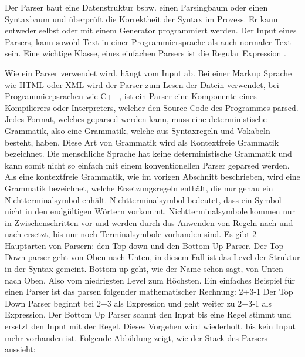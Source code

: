 Der Parser baut eine Datenstruktur bsbw. einen Parsingbaum oder einen Syntaxbaum und überprüft die Korrektheit der Syntax im Prozess. Er kann entweder selbst oder mit einem Generator programmiert werden. Der Input eines Parsers, kann sowohl Text in einer Programmiersprache als auch normaler Text sein. Eine wichtige Klasse, eines einfachen Parsers ist die \glqq{} Regular Expression \grqq{}.

Wie ein Parser verwendet wird, hängt vom Input ab. Bei einer Markup Sprache wie HTML oder XML wird der Parser zum Lesen der Datein verwendet, bei Programmierpsrachen wie C++, ist ein Parser eine Komponente eines Kompilierers oder Interpreters, welcher den Source Code des Programmes parsed.\newline\newline
Jedes Format, welches geparsed werden kann, muss eine deterministische Grammatik, also eine Grammatik, welche aus Syntaxregeln und Vokabeln besteht, haben. Diese Art von Grammatik wird als \glqq{} Kontextfreie Grammatik \grqq{} bezeichnet. Die menschliche Sprache hat keine deterministische Grammatik und kann somit nicht so einfach mit einem konventionellen Parser geparsed werden. \autocite[]{Garsiel.}\newline\newline
Als eine kontextfreie Grammatik, wie im vorigen Abschnitt beschrieben, wird eine Grammatik bezeichnet, welche Ersetzungsregeln enthält, die nur genau ein Nichtterminalsymbol enhält. Nichtterminalsymbol bedeutet, dass ein Symbol nicht in den endgültigen Wörtern vorkommt. Nichtterminalsymbole kommen nur in Zwischenschritten vor und werden durch das Anwenden von Regeln nach und nach ersetzt, bis nur noch Terminalsymbole vorhanden sind.\newline\newline
Es gibt 2 Hauptarten von Parsern: den \glqq{}Top down \grqq{} und den \glqq{} Bottom Up \grqq{} Parser. Der Top Down parser geht von Oben nach Unten, in diesem Fall ist das Level der Struktur in der Syntax gemeint. Bottom up geht, wie der Name schon sagt, von Unten nach Oben. Also vom niedrigsten Level zum Höchsten. \newline
Ein einfaches Beispiel für einen Parser ist das parsen folgender mathematischer Rechnung:
2+3-1\newline
Der Top Down Parser beginnt bei 2+3 als Expression und geht weiter zu 2+3-1 als Expression. \newline
Der Bottom Up Parser scannt den Input bis eine Regel stimmt und ersetzt den Input mit der Regel. Dieses Vorgehen wird wiederholt, bis kein Input mehr vorhanden ist. Folgende Abbildung zeigt, wie der Stack des Parsers aussieht:
